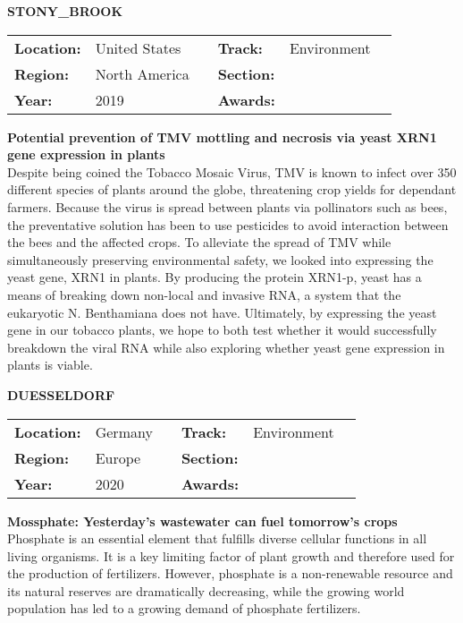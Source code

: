 \textbf{\uppercase{Stony\_Brook}}
\FloatBarrier
\begin{table}[h]
\begin{tabular}{lp{2.5cm}llll}
\textbf{Location:} & United States & \multicolumn{1}{|l}{} & \textbf{Track:}   & Environment \\
\textbf{Region:}   & North America   & \multicolumn{1}{|l}{} & \textbf{Section:} &  \\
\textbf{Year:}     & 2019   & \multicolumn{1}{|l}{} & \textbf{Awards:}  &
\end{tabular}
\end{table}
\FloatBarrier
\noindent	\textbf{Potential prevention of TMV mottling and necrosis via yeast XRN1 gene expression in plants} \vspace{.2cm}\\
Despite being coined the Tobacco Mosaic Virus, TMV is known to infect over 350 different species of plants around the globe, threatening crop yields for dependant farmers.  Because the virus is spread between plants via pollinators such as bees, the preventative solution has been to use pesticides to avoid interaction between the bees and the affected crops.  To alleviate the spread of TMV while simultaneously preserving environmental safety, we looked into expressing the yeast gene, XRN1 in plants.  By producing the protein XRN1-p, yeast has a means of breaking down non-local and invasive RNA, a system that the eukaryotic N. Benthamiana does not have.  Ultimately, by expressing the yeast gene in our tobacco plants, we hope to both test whether it would successfully breakdown the viral RNA while also exploring whether yeast gene expression in plants is viable.
\vspace{2cm} $ $
\pagebreak



\textbf{\uppercase{Duesseldorf}}
\FloatBarrier
\begin{table}[h]
\begin{tabular}{lp{2.5cm}llll}
\textbf{Location:} & Germany & \multicolumn{1}{|l}{} & \textbf{Track:}   & Environment \\
\textbf{Region:}   & Europe   & \multicolumn{1}{|l}{} & \textbf{Section:} &  \\
\textbf{Year:}     & 2020   & \multicolumn{1}{|l}{} & \textbf{Awards:}  &
\end{tabular}
\end{table}
\FloatBarrier
\noindent	\textbf{Mossphate: Yesterday's wastewater can fuel tomorrow's crops} \vspace{.2cm}\\
Phosphate is an essential element that fulfills diverse cellular functions in all living organisms. It is a key limiting factor of plant growth and therefore used for the production of fertilizers. However, phosphate is a non-renewable resource and its natural reserves are dramatically decreasing, while the growing world population has 
led to a growing demand of phosphate fertilizers.

